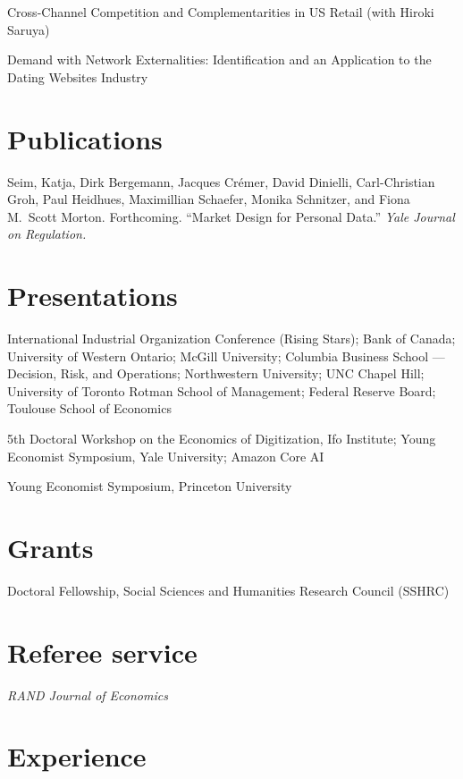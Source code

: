 \documentclass[11pt]{article} %
\begin{document}
 Cross-Channel Competition and Complementarities in US Retail
	(with Hiroki Saruya)

\medskip

 Demand with Network Externalities: 
Identification and an Application to the Dating Websites Industry


\section*{Publications}

Seim, Katja, Dirk Bergemann, Jacques Cr\'{e}mer, David Dinielli, 
Carl-Christian Groh, Paul Heidhues, Maximillian Schaefer, 
Monika Schnitzer, and Fiona M.\ Scott Morton. Forthcoming.
``Market Design for Personal Data.'' \textit{Yale Journal on Regulation.}

\section*{Presentations}

 International Industrial Organization Conference (Rising Stars); Bank of Canada; University of Western Ontario;
	McGill University; Columbia Business School --- Decision, Risk, and Operations;
	Northwestern University; UNC Chapel Hill; University of Toronto Rotman School
	of Management; Federal Reserve Board; Toulouse School of Economics


 5th Doctoral Workshop on the Economics of Digitization, Ifo Institute; 
	Young Economist Symposium, Yale University; Amazon Core AI


 Young Economist Symposium, Princeton University

\section*{Grants}

 Doctoral Fellowship, Social Sciences and Humanities Research Council (SSHRC)


\section*{Referee service}

\textit{RAND Journal of Economics}

\section*{Experience}
\end{document}
